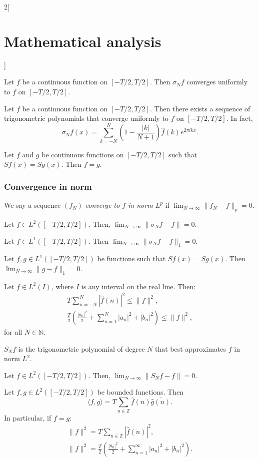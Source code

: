 \documentclass[../../../main.tex]{subfiles}
\begin{document}
\begin{multicols}{2}[\section{Mathematical analysis}]
\begin{theorem}
Let $f$ be a continuous function on $[-T/2,T/2]$. Then $\sigma_Nf$ converges uniformly to $f$ on $[-T/2,T/2]$.
\end{theorem}
\begin{corollary}
Let $f$ be a continuous function on $[-T/2,T/2]$. Then there exists a sequence of trigonometric polynomials that converge uniformly to $f$ on $[-T/2,T/2]$. In fact, $$\sigma_Nf(x)=\sum_{k=-N}^N\left(1-\frac{|k|}{N+1}\right)\widehat{f}(k)e^{2\pi ikx}.$$
\end{corollary}
\begin{corollary}
Let $f$ and $g$ be continuous functions on $[-T/2,T/2]$ such that $Sf(x)=Sg(x)$. Then $f=g$.
\end{corollary}
\subsubsection*{Convergence in norm}
\begin{definition}
We say a sequence $(f_N)$ \textit{converge to $f$ in norm $L^p$} if $\displaystyle\lim_{N\to\infty}\|f_N-f\|_p=0$.
\end{definition}
\begin{theorem}
Let $f\in L^2([-T/2,T/2])$. Then, $\displaystyle\lim_{N\to\infty}\|\sigma_Nf-f\|=0$.
\end{theorem}
\begin{corollary}
Let $f\in L^1([-T/2,T/2])$. Then $\displaystyle\lim_{N\to\infty}\|\sigma_Nf-f\|_1=0$.
\end{corollary}
\begin{corollary}
Let $f,g\in L^1([-T/2,T/2])$ be functions such that $Sf(x)=Sg(x)$. Then $\displaystyle\lim_{N\to\infty}\|g-f\|_1=0$.
\end{corollary}
\begin{theorem}
Let $f\in L^2(I)$, where $I$ is any interval on the real line. Then: \begin{gather*}T\sum_{n=-N}^N|\widehat{f}(n)|^2\leq\|f\|^2,\\\frac{T}{2}\left(\frac{|a_0|^2}{2}+\sum_{n=1}^N|a_n|^2+|b_n|^2\right)\leq \|f\|^2,\end{gather*} for all $N\in\mathbb{N}$.
\end{theorem}
\begin{theorem}
$S_Nf$ is the trigonometric polynomial of degree $N$ that best approximates $f$ in norm $L^2$.
\end{theorem}
\begin{corollary}
Let $f\in L^2([-T/2,T/2])$. Then, $\displaystyle\lim_{N\to\infty}\|S_Nf-f\|=0$.
\end{corollary}
\begin{theorem}
Let $f,g\in L^2([-T/2,T/2])$ be bounded functions. Then $$\langle f,g\rangle=T\sum_{n\in\mathbb{Z}}\widehat{f}(n)\overline{\widehat{g}(n)}.$$
In particular, if $f=g$:
\begin{gather*}\|f\|^2=T\sum_{n\in\mathbb{Z}}|\widehat{f}(n)|^2,\\\|f\|^2=\frac{T}{2}\left(\frac{|a_0|^2}{2}+\sum_{n=1}^\infty|a_n|^2+|b_n|^2\right).\end{gather*}
\end{theorem}

\end{multicols}
\end{document}
